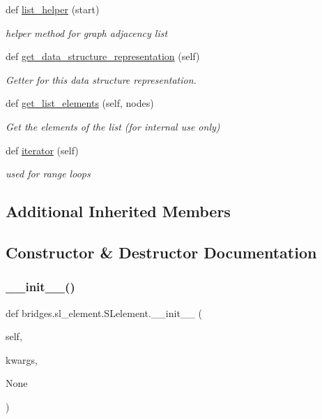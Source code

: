 \begin{DoxyCompactItemize}
def \hyperlink{classbridges_1_1sl__element_1_1_s_lelement_a7aaed085f18082fab6d027ca014130ca}{list\+\_\+helper} (start)
\begin{DoxyCompactList}\small\item\em helper method for graph adjacency list \end{DoxyCompactList}\item 
def \hyperlink{classbridges_1_1sl__element_1_1_s_lelement_af1d3039c3597ce0345d1cd973711714f}{get\+\_\+data\+\_\+structure\+\_\+representation} (self)
\begin{DoxyCompactList}\small\item\em Getter for this data structure representation. \end{DoxyCompactList}\item 
def \hyperlink{classbridges_1_1sl__element_1_1_s_lelement_ad3b94c8e7540aca841e6306c190e1be1}{get\+\_\+list\+\_\+elements} (self, nodes)
\begin{DoxyCompactList}\small\item\em Get the elements of the list (for internal use only) \end{DoxyCompactList}\item 
def \hyperlink{classbridges_1_1sl__element_1_1_s_lelement_a60570a813d474577ab1150bdd60137f9}{iterator} (self)
\begin{DoxyCompactList}\small\item\em used for range loops \end{DoxyCompactList}\end{DoxyCompactItemize}
\subsection*{Additional Inherited Members}


\subsection{Constructor \& Destructor Documentation}
\mbox{\label{classbridges_1_1sl__element_1_1_s_lelement_af95c000aa951fbf1c5912892248389d2}} 
\subsubsection{\texorpdfstring{\+\_\+\+\_\+init\+\_\+\+\_\+()}{\_\_init\_\_()}}
{\footnotesize\ttfamily def bridges.\+sl\+\_\+element.\+S\+Lelement.\+\_\+\+\_\+init\+\_\+\+\_\+ (\begin{DoxyParamCaption}\item[{}]{self,  }\item[{}]{kwargs,  }\item[{}]{None }\end{DoxyParamCaption})}



